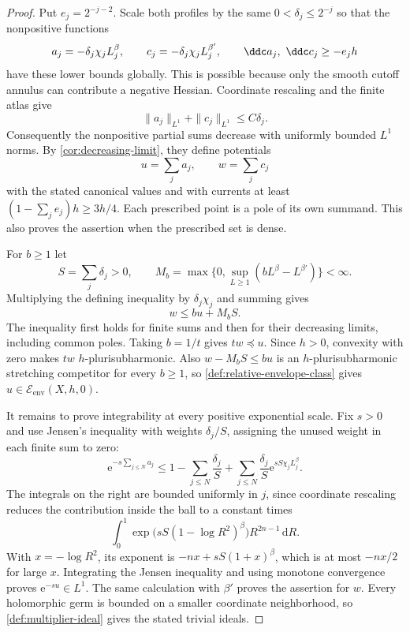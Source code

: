 \begin{proof}
Put $e_j=2^{-j-2}$. Scale both profiles by the same $0<\delta_j\leq2^{-j}$ so that the nonpositive functions
\begin{equation}\label{eq:countable-pole-terms}
 a_j=-\delta_j\chi_jL_j^\beta,
 \qquad c_j=-\delta_j\chi_jL_j^{\beta'},
 \qquad \ddc a_j,\ \ddc c_j\geq-e_jh
\end{equation}
have these lower bounds globally. This is possible because only the smooth cutoff annulus can contribute a negative Hessian. Coordinate rescaling and the finite atlas give
\[
 \|a_j\|_{L^1}+\|c_j\|_{L^1}\leq C\delta_j.
\]
Consequently the nonpositive partial sums decrease with uniformly bounded $L^1$ norms. By \cref{cor:decreasing-limit}, they define potentials
\[
 u=\sum_j a_j,\qquad w=\sum_j c_j
\]
with the stated canonical values and with currents at least $(1-\sum_j e_j)h\geq3h/4$. Each prescribed point is a pole of its own summand. This also proves the assertion when the prescribed set is dense.

For $b\geq1$ let
\[
 S=\sum_j\delta_j>0,\qquad
 M_b=\max\{0,\sup_{L\geq1}(bL^\beta-L^{\beta'})\}<\infty.
\]
Multiplying the defining inequality by $\delta_j\chi_j$ and summing gives
\begin{equation}\label{eq:countable-fixed-minorant}
 w\leq bu+M_bS.
\end{equation}
The inequality first holds for finite sums and then for their decreasing limits, including common poles. Taking $b=1/t$ gives $tw\preceq u$. Since $h>0$, convexity with zero makes $tw$ $h$-plurisubharmonic. Also $w-M_bS\leq bu$ is an $h$-plurisubharmonic stretching competitor for every $b\geq1$, so \cref{def:relative-envelope-class} gives $u\in\mathcal E_{\mathrm{env}}(X,h,0)$.

It remains to prove integrability at every positive exponential scale. Fix $s>0$ and use Jensen's inequality with weights $\delta_j/S$, assigning the unused weight in each finite sum to zero:
\[
 \mathrm e^{-s\sum_{j\leq N}a_j}
 \leq1-\sum_{j\leq N}\frac{\delta_j}{S}
     +\sum_{j\leq N}\frac{\delta_j}{S}
          \mathrm e^{sS\chi_jL_j^\beta}.
\]
The integrals on the right are bounded uniformly in $j$, since coordinate rescaling reduces the contribution inside the ball to a constant times
\[
 \int_0^1\exp\bigl(sS(1-\log R^2)^\beta\bigr)R^{2n-1}\,\mathrm dR.
\]
With $x=-\log R^2$, its exponent is $-nx+sS(1+x)^\beta$, which is at most $-nx/2$ for large $x$. Integrating the Jensen inequality and using monotone convergence proves $\mathrm e^{-su}\in L^1$. The same calculation with $\beta'$ proves the assertion for $w$. Every holomorphic germ is bounded on a smaller coordinate neighborhood, so \cref{def:multiplier-ideal} gives the stated trivial ideals.
\end{proof}

